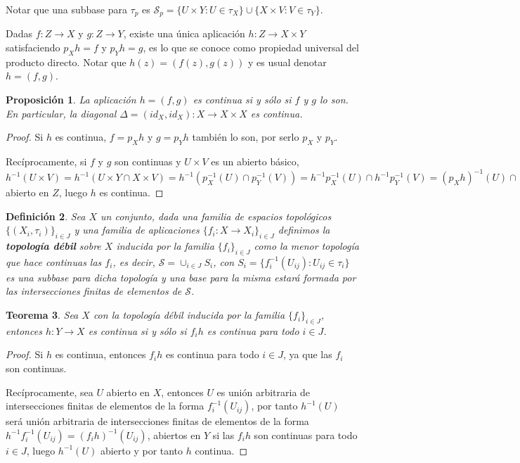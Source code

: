 \documentclass[12pt]{article}
\newtheorem{theorem}{Teorema}[section]
\newtheorem{proposition}[theorem]{Proposición}
\newtheorem{definition}[theorem]{Definición}
\begin{document}
Notar que una subbase para $\tau_p$ es $\mathcal{S}_p = \lbrace U \times Y: U \in \tau_X \rbrace \cup \lbrace X \times V: V \in \tau_Y \rbrace$.

Dadas $f \colon Z \longrightarrow X$ y $g \colon Z \longrightarrow Y$, existe una única aplicación $h \colon Z \longrightarrow X \times Y$ satisfaciendo $p_Xh = f$ y $p_Yh=g$, es lo que se conoce como propiedad universal del producto directo. Notar que $h(z) = (f(z),g(z))$ y es usual denotar $h=(f,g)$.

\begin{proposition}La aplicación $h = (f,g)$ es continua si y sólo si $f$ y $g$ lo son. En particular, la diagonal $\Delta = (id_X, id_X) \colon X  \longrightarrow X \times X$ es continua.
\end{proposition}
\begin{proof}
Si $h$ es continua, $f = p_Xh$ y $g = p_Yh$ también lo son, por serlo $p_X$ y $p_Y$. 

Recíprocamente, si $f$ y $g$ son continuas y $U \times V$ es un abierto básico, $h^{-1}(U \times V) = h^{-1}(U \times Y \cap X \times V) = h^{-1}(p_X^{-1}(U) \cap p_Y^{-1}(V)) = h^{-1}p_X^{-1}(U) \cap h^{-1}p_Y^{-1}(V) = (p_Xh)^{-1}(U) \cap (p_Yh)^{-1}(V) = f^{-1}(U) \cap g^{-1}(V)$ abierto en $Z$, luego $h$ es continua.

\end{proof}

\begin{definition}Sea $X$ un conjunto, dada una familia de espacios topológicos $\lbrace (X_i, \tau_i) \rbrace_{i\in J}$ y una familia de aplicaciones $\lbrace f_i \colon X \longrightarrow X_i \rbrace_{i\in J}$ definimos la \textbf{topología débil} sobre $X$ inducida por la familia $\lbrace f_i \rbrace_{i \in J}$ como la menor topología que hace continuas las $f_i$, es decir, $\mathcal{S} = \cup_{i \in J} S_i$, con $S_i = \lbrace f_i^{-1}(U_{ij}) : U_{ij} \in \tau_i \rbrace$ es una subbase para dicha topología y una base para la misma estará formada por las intersecciones finitas de elementos de $\mathcal{S}$.
\end{definition}

\begin{theorem}
Sea $X$ con la topología débil inducida por la familia $\lbrace f_i \rbrace_{i \in J}$, entonces $h \colon Y \longrightarrow X$ es continua si y sólo si $f_ih$ es continua para todo $i \in J$.
\end{theorem}
\begin{proof}
Si $h$ es continua, entonces $f_ih$ es continua para todo $i \in J$, ya que las $f_i$ son continuas. 

Recíprocamente, sea $U$ abierto en $X$, entonces $U$ es unión arbitraria de intersecciones finitas de elementos de la forma $f^{-1}_i(U_{ij})$, por tanto $h^{-1}(U)$ será unión arbitraria de intersecciones finitas de elementos de la forma $h^{-1}f_i^{-1}(U_{ij}) = (f_ih)^{-1}(U_{ij})$, abiertos en $Y$ si las $f_ih$ son continuas para todo $i \in J$, luego $h^{-1}(U)$ abierto y por tanto $h$ continua.

\end{proof}
\end{document}
